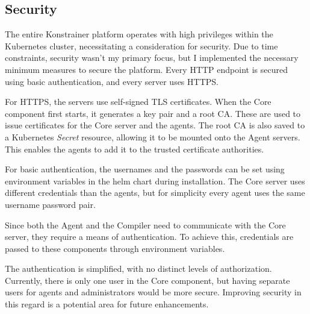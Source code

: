 \subsection{Security}

The entire Konstrainer platform operates with high privileges within the Kubernetes cluster, necessitating a consideration for security. Due to time constraints, security wasn't my primary focus, but I implemented the necessary minimum measures to secure the platform. Every HTTP endpoint is secured using basic authentication, and every server uses HTTPS.

For HTTPS, the servers use self-signed TLS certificates. When the Core component first starts, it generates a key pair and a root CA. These are used to issue certificates for the Core server and the agents. The root CA is also saved to a Kubernetes \emph{Secret} resource, allowing it to be mounted onto the Agent servers. This enables the agents to add it to the trusted certificate authorities.

For basic authentication, the usernames and the passwords can be set using environment variables in the helm chart during installation. The Core server uses different credentials than the agents, but for simplicity every agent uses the same username password pair. 

Since both the Agent and the Compiler need to communicate with the Core server, they require a means of authentication. To achieve this, credentials are passed to these components through environment variables.

The authentication is simplified, with no distinct levels of authorization. Currently, there is only one user in the Core component, but having separate users for agents and administrators would be more secure. Improving security in this regard is a potential area for future enhancements.
